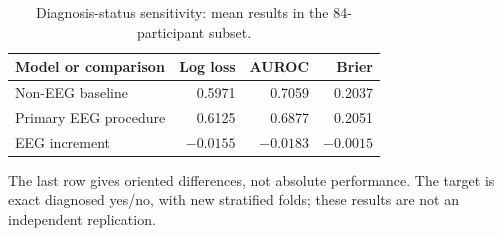 \begin{table}[!htbp]
\centering\small
\caption{Diagnosis-status sensitivity: mean results in the 84-participant subset.}
\label{tab:diagnosis}
\setlength{\tabcolsep}{4pt}\renewcommand{\arraystretch}{1.14}
\begin{tabularx}{\textwidth}{@{}>{\raggedright\arraybackslash}Xrrr@{}}
\toprule
Model or comparison & Log loss & AUROC & Brier\\\midrule
Non-EEG baseline & 0.5971 & 0.7059 & 0.2037\\
Primary EEG procedure & 0.6125 & 0.6877 & 0.2051\\
\midrule EEG increment & $-0.0155$ & $-0.0183$ & $-0.0015$\\
\bottomrule\end{tabularx}
\par\smallskip\begin{minipage}{\textwidth}\footnotesize The last row gives oriented differences, not absolute performance. The target is exact diagnosed yes/no, with new stratified folds; these results are not an independent replication.\end{minipage}
\end{table}


